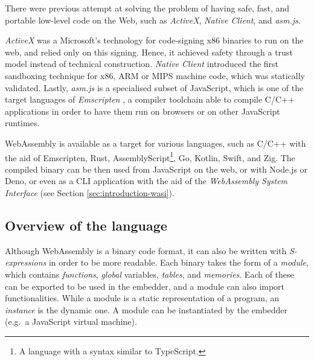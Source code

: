 There were previous attempt at solving the problem of having safe, fast, and portable low-level code on the Web,
such as \textit{ActiveX}, \textit{Native Client}, and \textit{asm.js}.

\textit{ActiveX} \cite{activex} was a Microsoft's technology for code-signing x86 binaries to run on the web, and relied only
on this signing. Hence, it achieved safety through a trust model instead of technical construction.
\textit{Native Client} \cite{native-client} introduced the first sandboxing technique for x86, ARM or MIPS machine code,
which was statically validated. Lastly, \textit{asm.js} \cite{asmjs} is a specialised subset of JavaScript, which is one of the target
languages of \textit{Emscripten} \cite{emscripten}, a compiler toolchain able to compile C/C++ applications in order to have them
run on browsers or on other JavaScript runtimes.

WebAssembly is available as a target for various languages, such as C/C++ with the aid of Emscripten, Rust,
AssemblyScript\footnote{A language with a syntax similar to TypeScript.}, Go, Kotlin, Swift, and Zig.
The compiled binary can be then used from JavaScript on the web, or with Node.js or Deno, or even as a CLI application
with the aid of the \textit{WebAssembly System Interface} (see Section \ref*{sec:introduction-wasi}).

\subsection{Overview of the language}

Although WebAssembly is a binary code format, it can also be written with \textit{S-expressions}
in order to be more readable.
Each binary takes the form of a \textit{module}, which contains \textit{functions}, \textit{global} variables,
\textit{tables}, and \textit{memories}. Each of these can be exported to be used in the embedder, and a module can also import functionalities.
While a module is a static representation of a program, an \textit{instance} is the dynamic one.
A module can be instantiated by the embedder (e.g.\ a JavaScript virtual machine).


